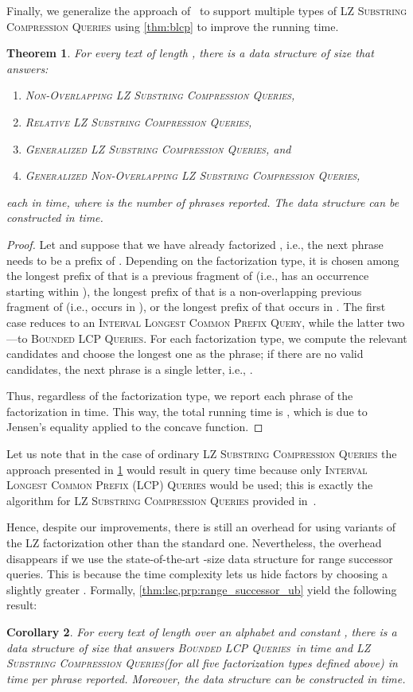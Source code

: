 \documentclass[a4paper]{article}
\newtheorem{theorem}{Theorem}[section]
\newtheorem{corollary}[theorem]{Corollary}
\theoremstyle{definition}
\theoremstyle{remark}
\newcommand{\BLCP}{\textsc{Bounded LCP Queries}\xspace}
\newcommand{\ILCP}{\textsc{Interval Longest Common Prefix (LCP) Queries}\xspace}
\newcommand{\LSC}{\textsc{LZ Substring Compression Queries}\xspace}
\newcommand{\GSC}{\textsc{Generalized LZ Substring Compression Queries}\xspace}
\newcommand{\maybeqed}{}
\begin{document}
\thmblcp*

Finally, we generalize the approach of~\cite{DBLP:journals/tcs/KellerKFL14} to support multiple types of \LSC using \cref{thm:blcp} to improve the running time.


\begin{theorem}\label{thm:lsc}
For every text  of length , there is a data structure of size 
that answers:
\begin{enumerate}[label=(\alph*)]
  \item \textsc{Non-Overlapping} \LSC,
  \item \textsc{Relative} \LSC,
  \item \GSC, and
    \item \textsc{Generalized Non-Overlapping} \LSC,
\end{enumerate}
each in  time,
where  is the number of phrases reported.
The data structure can be constructed in  time.
\end{theorem}
\begin{proof}
Let  and suppose that we have already factorized ,
i.e., the next phrase needs to be a prefix of .
Depending on the factorization type, it is chosen among the longest prefix of  that is a previous fragment of  (i.e., has an occurrence starting within ), the longest prefix of  that is a non-overlapping previous fragment of  (i.e., occurs in ),
or the longest prefix of  that occurs in .
The first case reduces to an \textsc{Interval Longest Common Prefix Query}, while the latter two---to \BLCP.
For each factorization type, we compute the relevant candidates and choose the longest one as the phrase;
if there are no valid candidates, the next phrase is a single letter, i.e., .

Thus, regardless of the factorization type, we report each phrase  of the factorization 
in  time. 
This way, the total running time is , which is   due to Jensen's equality applied to the concave  function.
\maybeqed \end{proof}

Let us note that in the case of ordinary \LSC the approach presented in \cref{thm:lsc} would result in  query time
because only \ILCP would be used; this is exactly the algorithm for \LSC provided in~\cite{DBLP:journals/tcs/KellerKFL14}.

Hence, despite our improvements, there is still an overhead for using variants of the LZ factorization other than the standard one.
Nevertheless, the overhead disappears if we use the state-of-the-art -size data structure for range successor queries. This is because the  time complexity lets us hide  factors
by choosing a slightly greater .
Formally, \cref{thm:lsc,prp:range_successor_ub} yield the following result:
\begin{corollary}\label{cor:app-blcp}
For every text  of length  over an alphabet  and constant , there is a data structure of size 
that answers \BLCP\ in  time
and \LSC (for all five factorization types defined above) in  time per phrase reported.
Moreover, the data structure can be constructed in  time.
\end{corollary}
\end{document}
